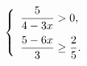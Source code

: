 \begin{ex}[type=ineq_system]
	\begin{condition}
		\( \left\{
		\begin{array}{l}
			\dfrac{5}{4-3x}>0,\vspace{2mm}\\
			\dfrac{5-6x}{3}\ge\dfrac{2}{5}.
		\end{array}
		\right. \)
	\end{condition}
\end{ex}